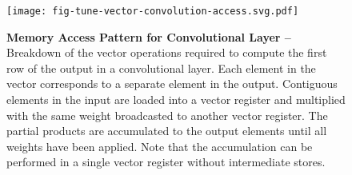 
\begin{figure}[h!]

  \centering
  \texttt{[image: fig-tune-vector-convolution-access.svg.pdf]}

  \caption{\textbf{Memory Access Pattern for Convolutional Layer --}
    Breakdown of the vector operations required to compute the first row
    of the output in a convolutional layer. Each element in the vector
    corresponds to a separate element in the output. Contiguous elements
    in the input are loaded into a vector register and multiplied with
    the same weight broadcasted to another vector register. The partial
    products are accumulated to the output elements until all weights
    have been applied. Note that the accumulation can be performed in a
    single vector register without intermediate stores.}

  \label{fig-tuning-vectorization-convolution-access}

\end{figure}

